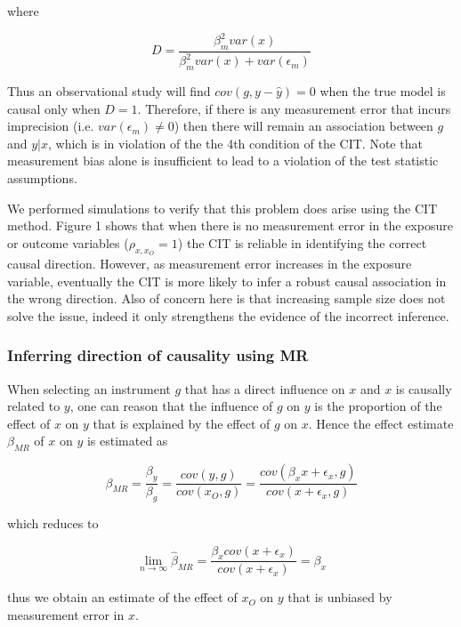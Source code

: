 \documentclass[]{article}
\begin{document}
where

\[
D = \frac{\beta^2_m var(x)} {\beta^2_m var(x) + var(\epsilon_m)}
\]

Thus an observational study will find \(cov(g, y - \hat{y}) = 0\) when
the true model is causal only when \(D = 1\). Therefore, if there is any
measurement error that incurs imprecision (i.e.
\(var(\epsilon_m) \neq 0\)) then there will remain an association
between \(g\) and \(y|x\), which is in violation of the the 4th
condition of the CIT. Note that measurement bias alone is insufficient
to lead to a violation of the test statistic assumptions.

We performed simulations to verify that this problem does arise using
the CIT method. Figure 1 shows that when there is no measurement error
in the exposure or outcome variables (\(\rho_{x, x_O}=1\)) the CIT is
reliable in identifying the correct causal direction. However, as
measurement error increases in the exposure variable, eventually the CIT
is more likely to infer a robust causal association in the wrong
direction. Also of concern here is that increasing sample size does not
solve the issue, indeed it only strengthens the evidence of the
incorrect inference.

\subsubsection{Inferring direction of causality using
MR}\label{inferring-direction-of-causality-using-mr}

When selecting an instrument \(g\) that has a direct influence on \(x\)
and \(x\) is causally related to \(y\), one can reason that the
influence of \(g\) on \(y\) is the proportion of the effect of \(x\) on
\(y\) that is explained by the effect of \(g\) on \(x\). Hence the
effect estimate \(\beta_{MR}\) of \(x\) on \(y\) is estimated as

\[
\beta_{MR} = \frac{\beta_y}{\beta_g} = \frac{cov(y, g)}{cov(x_O, g)} = \frac{cov(\beta_x x + \epsilon_x, g)}{cov(x + \epsilon_x, g)}
\]

which reduces to

\[
\lim_{n \to \infty} \hat{\beta}_{MR} = \frac{\beta_x cov(x + \epsilon_x)}{cov(x + \epsilon_x)} = \beta_x
\]

thus we obtain an estimate of the effect of \(x_O\) on \(y\) that is
unbiased by measurement error in \(x\).
\end{document}
